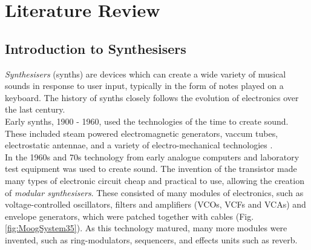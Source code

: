 \documentclass[11pt, oneside]{report}   	%
\begin{document}
\chapter{Literature Review}
\section{Introduction to Synthesisers}
\emph{Synthesisers} (synths) are devices which can create a wide variety of musical sounds in response to  user input, typically in the form of notes played on a keyboard. The history of synths closely follows the evolution of electronics over the last century.\\
Early synths, 1900 - 1960, used the technologies of the time to create sound. These included steam powered electromagnetic generators, vaccum tubes, electrostatic antennae, and a variety of electro-mechanical technologies \cite{AppleSynth}.\\
In the 1960s and 70s technology from early analogue computers and laboratory test equipment was used to create sound. The invention of the transistor made many types of electronic circuit cheap and practical to use, allowing the creation of  \emph{modular synthesisers}. These consisted of many modules of electronics, such as voltage-controlled oscillators, filters and amplifiers (VCOs, VCFs and VCAs) and envelope generators, which were patched together with cables (Fig. \ref{fig:MoogSystem35}). As this technology matured, many more modules were invented, such as ring-modulators, sequencers, and effects units such as reverb.
%
\end{document}
